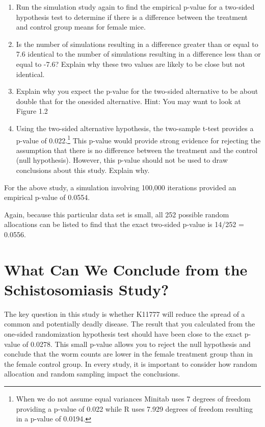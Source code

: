 \documentclass[
]{report}
\providecommand{\tightlist}{%
  \setlength{\itemsep}{0pt}\setlength{\parskip}{0pt}}
\theoremstyle{definition}
\theoremstyle{definition}
\theoremstyle{definition}
\theoremstyle{definition}
\theoremstyle{remark}
\begin{document}
\begin{enumerate}
\def\labelenumi{\arabic{enumi}.}
\setcounter{enumi}{12}
\tightlist
\item
  Run the simulation study again to find the empirical p-value for a two-sided hypothesis test to determine
  if there is a difference between the treatment and control group means for female mice.
\item
  Is the number of simulations resulting in a difference greater than or equal to 7.6 identical to the number
  of simulations resulting in a difference less than or equal to -7.6? Explain why these two values
  are likely to be close but not identical.
\item
  Explain why you expect the p-value for the two-sided alternative to be about double that for the onesided
  alternative. Hint: You may want to look at Figure 1.2
\item
  Using the two-sided alternative hypothesis, the two-sample t-test provides a p-value of 0.022.\footnote{When we do not assume equal variances Minitab uses 7 degrees of freedom providing a p-value of 0.022 while R uses
    7.929 degrees of freedom resulting in a p-value of 0.0194.} This
  p-value would provide strong evidence for rejecting the assumption that there is no difference between
  the treatment and the control (null hypothesis). However, this p-value should not be used to draw
  conclusions about this study. Explain why.
\end{enumerate}

For the above study, a simulation involving 100,000 iterations provided an empirical p-value of 0.0554.

Again, because this particular data set is small, all 252 possible random allocations can be listed to find that
the exact two-sided p-value is 14/252 = 0.0556.

\hypertarget{what-can-we-conclude-from-the-schistosomiasis-study}{%
\section{\texorpdfstring{\textbf{What Can We Conclude from the Schistosomiasis Study?}}{What Can We Conclude from the Schistosomiasis Study?}}\label{what-can-we-conclude-from-the-schistosomiasis-study}}

The key question in this study is whether K11777 will reduce the spread of a common and potentially deadly
disease. The result that you calculated from the one-sided randomization hypothesis test should have been
close to the exact p-value of 0.0278. This small p-value allows you to reject the null hypothesis and conclude
that the worm counts are lower in the female treatment group than in the female control group. In every study,
it is important to consider how random allocation and random sampling impact the conclusions.
\end{document}
